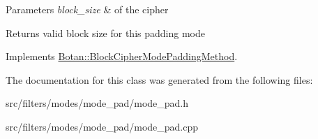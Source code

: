 \begin{DoxyParams}{Parameters}
{\em block\-\_\-size} & of the cipher \\
\hline
\end{DoxyParams}
\begin{DoxyReturn}{Returns}
valid block size for this padding mode 
\end{DoxyReturn}


Implements \hyperlink{classBotan_1_1BlockCipherModePaddingMethod_a49f6743ae35a39d462de148c05202227}{Botan\-::\-Block\-Cipher\-Mode\-Padding\-Method}.



The documentation for this class was generated from the following files\-:\begin{DoxyCompactItemize}
\item 
src/filters/modes/mode\-\_\-pad/mode\-\_\-pad.\-h\item 
src/filters/modes/mode\-\_\-pad/mode\-\_\-pad.\-cpp\end{DoxyCompactItemize}
